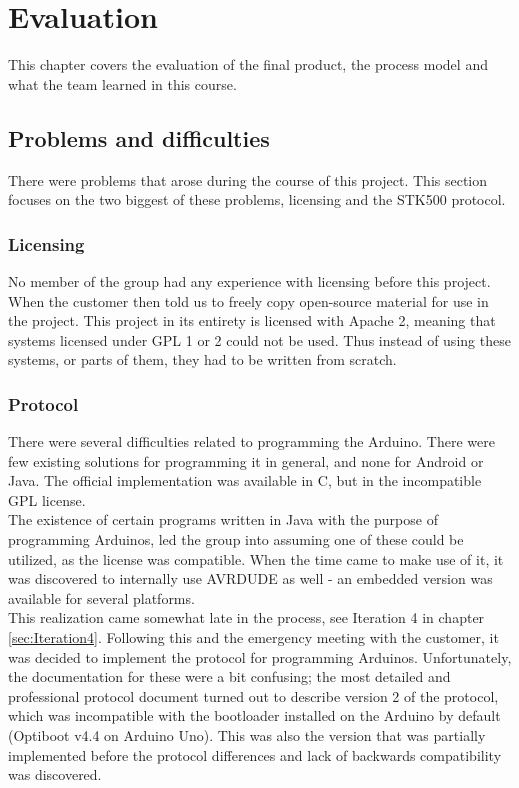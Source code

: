 \chapter{Evaluation}

This chapter covers the evaluation of the final product, the process model and what the team learned in this course.

\section{Problems and difficulties}
	There were problems that arose during the course of this project. This section focuses on the two biggest of these problems, licensing and the STK500 protocol.

	\subsection{Licensing}
	No member of the group had any experience with licensing before this project. When the customer then told us to freely copy open-source material for use in the project. This project in its entirety is licensed with Apache 2, meaning that systems licensed under GPL 1 or 2 could not be used. Thus instead of using these systems, or parts of them, they had to be written from scratch.

	\subsection{Protocol}\label{sec:protocol-issues}
	There were several difficulties related to programming the Arduino. There were few existing solutions for programming it in general, and none for Android or Java. The official implementation was available in C, but in the incompatible GPL license.\\

	The existence of certain programs written in Java with the purpose of programming Arduinos,
	led the group into assuming one of these could be utilized, as the license was compatible. When the time came to make use of it, it was discovered to internally use AVRDUDE as well - an embedded version was available for several platforms.\\

	This realization came somewhat late in the process, see Iteration 4 in chapter \ref{sec:Iteration4}. Following this and the emergency meeting with the customer, it was decided to implement the protocol for programming Arduinos. Unfortunately, the documentation for these were a bit confusing; the most detailed and professional protocol document turned out to describe version 2 of the protocol\cite{AVR068}, which was incompatible with the bootloader installed on the Arduino by default (Optiboot v4.4 on Arduino Uno). This was also the version that was partially implemented before the protocol differences and lack of backwards compatibility was discovered.\\

